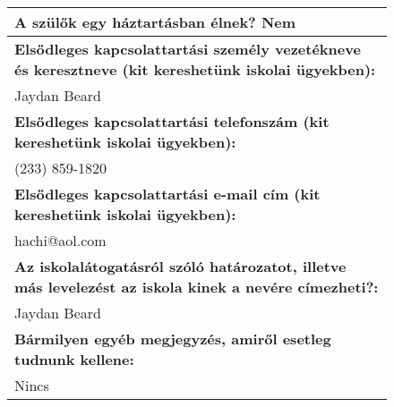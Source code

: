 \documentclass[10pt,a4paper]{article}
\begin{document}
\begin{figure}[!ht]
\begin{tabular}{|m{\textwidth}|}
\hline\vspace{3pt}
\textbf{A szülők egy háztartásban élnek? } \hspace{0.5cm} Nem \vspace{3pt} \\
\hline\vspace{3pt}
\textbf{Elsődleges kapcsolattartási személy vezetékneve és keresztneve (kit kereshetünk iskolai ügyekben):} \\ \hspace{0.5cm} Jaydan Beard \vspace{3pt} \\
\hline\vspace{3pt}
\textbf{Elsődleges kapcsolattartási telefonszám (kit kereshetünk iskolai ügyekben):} \\ \hspace{0.5cm} (233) 859-1820 \vspace{3pt} \\
\hline\vspace{3pt}
\textbf{Elsődleges kapcsolattartási e-mail cím (kit kereshetünk iskolai ügyekben):} \\ \hspace{0.5cm} hachi@aol.com \vspace{3pt} \\
\hline\vspace{3pt}
\textbf{Az iskolalátogatásról szóló határozatot, illetve más levelezést az iskola kinek a nevére címezheti?:} \\ \hspace{0.5cm} Jaydan Beard \vspace{3pt} \\
\hline\vspace{3pt}
\textbf{Bármilyen egyéb megjegyzés, amiről esetleg tudnunk kellene:} \\ \hspace{0.5cm} Nincs \vspace{3pt} \\


\end{tabular}
\end{figure}
\end{document}
